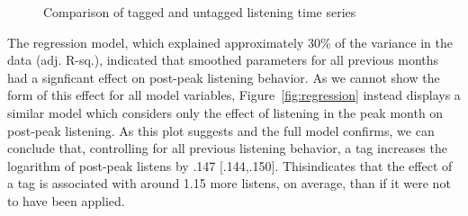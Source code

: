   \begin{figure}
    \hfill
    \caption{Comparison of tagged and untagged listening time series}
    \label{fig:regressionFigs}
  \end{figure}

The regression model, which explained approximately 30\% of the variance in the data (adj. R-sq.), indicated that smoothed parameters for all previous months had a signficant effect on post-peak listening behavior.  As we cannot show the form of this effect for all model variables, Figure~\ref{fig:regression} instead displays a similar model which considers only the effect of listening in the peak month on post-peak listening. As this plot suggests and the full model confirms, we can conclude that, controlling for all previous listening behavior, a tag increases the logarithm of post-peak listens by .147 [.144,.150]. Thisindicates that the effect of a tag is associated with around 1.15 more listens, on average, than if it were not to have been applied.   

